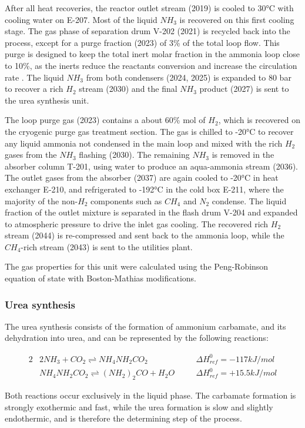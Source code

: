 \documentclass[a4paper, titlepage]{article}
\begin{document}
After all heat recoveries, the reactor outlet stream (2019) is cooled to 30°C with cooling water on E-207. Most of the 
liquid $NH_3$ is recovered on this first cooling stage. The gas phase of separation drum V-202 (2021) is recycled back
into the process, except for a purge fraction (2023) of 3\% of the total loop flow. This purge is designed to keep the
total inert molar fraction in the ammonia loop close to 10\%, as the inerts reduce the reactants conversion and
increase the circulation rate \cite{florez-orregoProcessSynthesisOptimization2018}. 
The liquid $NH_3$ from both condensers (2024, 2025) is expanded to 80 bar to recover a rich $H_2$ stream (2030) and
the final $NH_3$ product (2027) is sent to the urea synthesis unit.

The loop purge gas (2023) contains a about 60\% mol of $H_2$, which is recovered on the cryogenic purge gas treatment 
section. The gas is chilled to -20°C to recover any liquid ammonia not condensed in the main loop and mixed with the
rich $H_2$ gases from the $NH_3$ flashing (2030). The remaining $NH_3$ is removed in the absorber column T-201, 
using water to produce an aqua-ammonia stream (2036). The outlet gases from the absorber (2037) are again cooled to
-20°C  in heat exchanger E-210, and refrigerated to -192°C in the cold box E-211, where the majority of the non-$H_2$
components such as $CH_4$ and $N_2$ condense. The liquid fraction of the outlet mixture is separated in the flash drum V-204 and expanded to atmospheric pressure to drive the inlet gas cooling. The recovered rich $H_2$ stream (2044) is re-compressed
and sent back to the ammonia loop, while the $CH_4$-rich stream (2043) is sent to the utilities plant.

The gas properties for this unit were calculated using the Peng-Robinson equation of state with Boston-Mathias
modifications.

\subsubsection{Urea synthesis}
The urea synthesis consists of the formation of ammonium carbamate, and its dehydration into urea, and can be
represented by the following reactions:

\begin{alignat}{2}
	&2NH_3 + CO_2 \rightleftharpoons NH_4NH_2CO_2 \quad & &\Delta H_{ref}^0 = -117 kJ/mol  \\
	&NH_4NH_2CO_2 \rightleftharpoons (NH_2)_2CO + H_2O \quad & &\Delta H_{ref}^0 = +15.5 kJ/mol 
\end{alignat}

Both reactions occur exclusively in the liquid phase. The carbamate formation is strongly exothermic and fast, while 
the urea formation is slow and slightly endothermic, and is therefore the determining step of the process.




\printbibliography{}
\end{document}
